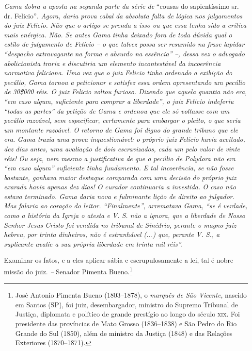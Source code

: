 \begin{didascalia}
\emph{Gama dobra a aposta na segunda parte da série de} ``cousas do
sapientíssimo sr. dr. Felicio''\emph{. Agora, daria prova cabal da
absoluta falta de lógica nos julgamentos do juiz Felicio. Não que o
artigo se prenda a isso ou que essa tenha sido a crítica mais enérgica.
Não. Se antes Gama tinha deixado fora de toda dúvida qual o estilo de
julgamento de Felicio -- o que talvez possa ser resumido na frase
lapidar ``despacho extravagante na forma e absurdo na essência'' --, dessa
vez o advogado abolicionista traria e discutiria um elemento
incontestável da incoerência normativa feliciana. Uma vez que o juiz
Felicio tinha ordenado a exibição do pecúlio, Gama tornou a peticionar e
satisfez essa ordem apresentando um pecúlio de 30\$000 réis. O juiz
Felicio voltou furioso. Dizendo que aquela quantia não era, ``em caso
algum, suficiente para comprar a liberdade'', o juiz Felicio indeferiu
``todas as partes'' da petição de Gama e ordenou que ele só voltasse com
um pecúlio razoável, sem especificar, certamente para embargar o pleito,
o que seria um montante razoável. O retorno de Gama foi digno do grande
tribuno que ele era. Gama trazia uma prova inquestionável: o próprio
juiz Felicio havia aceitado, dez dias antes, uma avaliação de dois
escravizados, cada um pelo valor de vinte réis! Ou seja, nem mesmo a
justificativa de que o pecúlio de Polydora não era ``em caso algum''
suficiente tinha fundamento. E tal incoerência, se não fosse bastante,
ganhava maior destaque comparada com uma decisão do próprio juiz exarada
havia apenas dez dias! O curador continuaria a investida. O caso não
estava terminado. Gama daria nova e fulminante lição de direito ao
julgador. Mas falaria ao coração do leitor. ``Finalmente'', arrematava
Gama, ``se é verdade, como a história da Igreja o atesta e V. S. não a
ignora, que a liberdade de Nosso Senhor Jesus Cristo foi vendida no
tribunal de Sinédrio, perante o magno juiz hebreu, por trinta dinheiros,
não é estranhável (...) que, perante V. S., a suplicante avalie a sua
própria liberdade em trinta mil réis''.}
\end{didascalia}

\asterisc{}

Examinar os fatos, e a eles aplicar sábia e escrupulosamente a lei, tal
é nobre missão do juiz. \emph{--} Senador Pimenta Bueno.\footnote{ José
  Antonio Pimenta Bueno (1803--1878), o \emph{marquês de São Vicente},
  nascido em Santos (SP), foi juiz, desembargador, ministro do Supremo
  Tribunal de Justiça, diplomata e político de grande prestígio ao longo
  do século \textsc{xix}. Foi presidente das províncias de Mato Grosso
  (1836--1838) e São Pedro do Rio Grande do Sul (1850), além de ministro
  da Justiça (1848) e das Relações Exteriores (1870--1871).}

